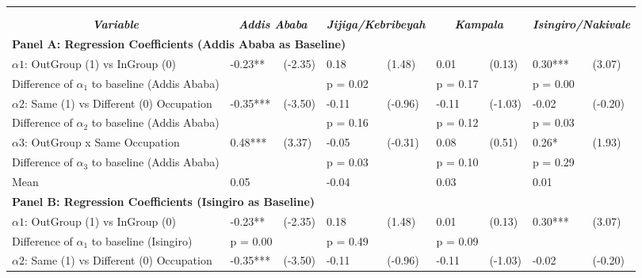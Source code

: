 \begin{tabular}{l*{8}{l}} \toprule 
                &\multicolumn{2}{c}{ } &\multicolumn{2}{c}{ } &\multicolumn{2}{c}{ } &\multicolumn{2}{c}{ } \\
\\[-0.6cm] \multicolumn{1}{c}{\textit{\textbf{Variable}}} & \multicolumn{2}{c}{\textit{\textbf{Addis Ababa}}} & \multicolumn{2}{c}{\textit{\textbf{Jijiga/Kebribeyah}}} & \multicolumn{2}{c}{\textit{\textbf{Kampala}}} & \multicolumn{2}{c}{\textit{\textbf{Isingiro/Nakivale}}} \\ \midrule  \multicolumn{8}{l}{\textbf{Panel A: Regression Coefficients (Addis Ababa as Baseline)}} \\   
$\alpha1$: OutGroup (1) vs InGroup (0)&    -0.23** &  (-2.35)&     0.18   &   (1.48)&     0.01   &   (0.13)&     0.30***&   (3.07)\\
 
Difference of $\alpha_1$ to baseline (Addis Ababa) & & &  p = 0.02 & & p = 0.17 & & p = 0.00 & \\ $\alpha2$: Same (1) vs Different (0) Occupation&    -0.35***&  (-3.50)&    -0.11   &  (-0.96)&    -0.11   &  (-1.03)&    -0.02   &  (-0.20)\\
 
Difference of $\alpha_2$ to baseline (Addis Ababa) & & & p = 0.16 & & p = 0.12 & & p = 0.03 & \\ $\alpha3$: OutGroup x Same Occupation&     0.48***&   (3.37)&    -0.05   &  (-0.31)&     0.08   &   (0.51)&     0.26*  &   (1.93)\\
 
Difference of $\alpha_3$ to baseline (Addis Ababa) & & & p = 0.03 & & p = 0.10 & & p = 0.29 & \\ Mean            &     0.05&         &    -0.04&         &     0.03&         &     0.01&         \\
 
  \midrule  \multicolumn{8}{l}{\textbf{Panel B: Regression Coefficients (Isingiro as Baseline)}} \\   
$\alpha1$: OutGroup (1) vs InGroup (0)&    -0.23** &  (-2.35)&     0.18   &   (1.48)&     0.01   &   (0.13)&     0.30***&   (3.07)\\
 
Difference of $\alpha_1$ to baseline (Isingiro) &  p = 0.00 & & p = 0.49 & & p = 0.09 & & &  \\ $\alpha2$: Same (1) vs Different (0) Occupation&    -0.35***&  (-3.50)&    -0.11   &  (-0.96)&    -0.11   &  (-1.03)&    -0.02   &  (-0.20)\\
 

\end{tabular}
